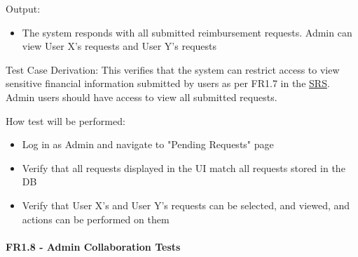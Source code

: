 \documentclass[12pt, titlepage]{article}
\begin{document}
\begin{enumerate}
    Output: 
    \begin{itemize}
        \item The system responds with all submitted reimbursement requests. Admin can view User X's requests and User Y's requests
    \end{itemize}
    
    Test Case Derivation: This verifies that the system can restrict access to view sensitive financial information submitted by users as per FR1.7 in the \href{https://shorturl.at/FdAgR}{SRS}. Admin users should have access to view all submitted requests.
    
    How test will be performed:
    \begin{itemize}
        \item Log in as Admin and navigate to "Pending Requests" page
        \item Verify that all requests displayed in the UI match all requests stored in the DB
        \item Verify that User X's and User Y's requests can be selected, and viewed, and actions can be performed on them
    \end{itemize}
\end{enumerate}

\paragraph{FR1.8 - Admin Collaboration Tests}
\end{document}
